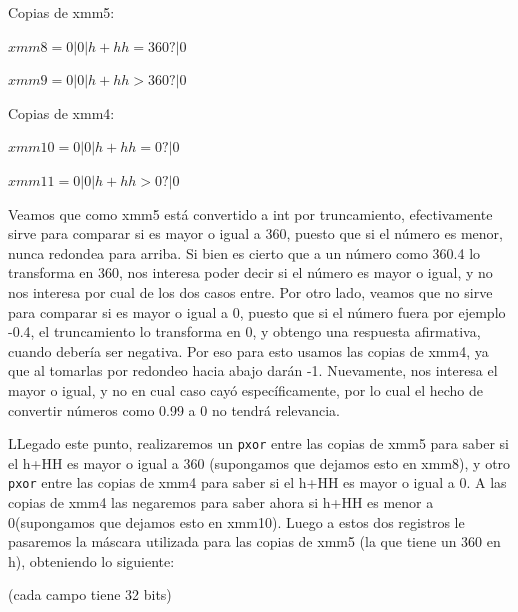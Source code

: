 \documentclass[a4paper]{article}
\begin{document}
Copias de xmm5:

\vspace*{0.3cm}

$xmm8= 0 | 0 | h+hh = 360? | 0$

\vspace*{0.3cm} 

$xmm9=0 | 0 | h+hh > 360? | 0$

\vspace*{0.3cm}

Copias de xmm4:

\vspace*{0.3cm}

$xmm10= 0 | 0 | h+hh = 0? | 0$

\vspace*{0.3cm}

$xmm11= 0 | 0 | h+hh > 0? | 0$

\vspace*{0.3cm}

Veamos que como xmm5 está convertido a int por truncamiento, efectivamente sirve para comparar si es mayor o igual a 360, puesto que si el número es menor, nunca redondea para arriba. Si bien es cierto que a un número como 360.4 lo transforma en 360, nos interesa poder decir si el número es mayor o igual, y no nos interesa por cual de los dos casos entre. Por otro lado, veamos que no sirve para comparar si es mayor o igual a 0, puesto que si el número fuera por ejemplo -0.4, el truncamiento lo transforma en 0, y obtengo una respuesta afirmativa, cuando debería ser negativa. Por eso para esto usamos las copias de xmm4, ya que al tomarlas por redondeo hacia abajo darán -1. Nuevamente, nos interesa el mayor o igual, y no en cual caso cayó específicamente, por lo cual el hecho de convertir números como 0.99 a 0 no tendrá relevancia.

LLegado este punto, realizaremos un {\tt pxor} entre las copias de xmm5 para saber si el h+HH es mayor o igual a 360 (supongamos que dejamos esto en xmm8), y otro {\tt pxor} entre las copias de xmm4 para saber si el h+HH es mayor o igual a 0. A las copias de xmm4 las negaremos para saber ahora si h+HH es menor a 0(supongamos que dejamos esto en xmm10). Luego a estos dos registros le pasaremos la máscara utilizada para las copias de xmm5 (la que tiene un 360 en h), obteniendo lo siguiente:

\vspace*{0.3cm}

(cada campo tiene 32 bits)

\vspace*{0.3cm}
\end{document}
